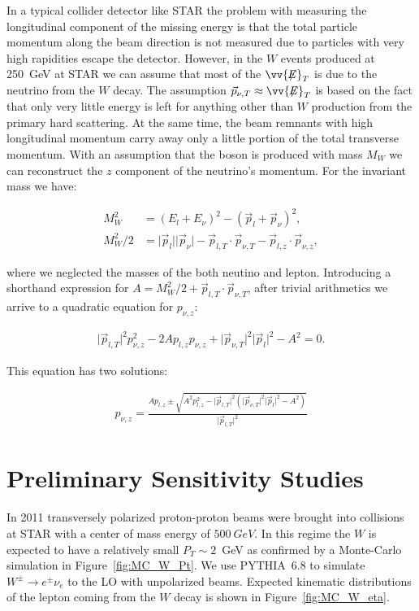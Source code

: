 \documentclass[12pt]{article}
\newcommand{\missET}{\vv{\not{\!\!E}}_T}
\newcommand{\abs}[1]{\lvert#1\rvert}
\begin{document}
In a typical collider detector like STAR the problem with measuring the
longitudinal component of the missing energy is that the total particle momentum
along the beam direction is not measured due to particles with very high
rapidities escape the detector. However, in the $W$ events produced at 250~GeV
at STAR we can assume that most of the $\missET$ is due to the neutrino from the
$W$ decay. The assumption $\vec{p}_{\nu, T} \approx \missET$ is based on the
fact that only very little energy is left for anything other than $W$ production
from the primary hard scattering. At the same time, the beam remnants with high
longitudinal momentum carry away only a little portion of the total transverse
momentum. With an assumption that the boson is produced with mass $M_W$ we can
reconstruct the $z$ component of the neutrino's momentum. For the invariant mass
we have:

\begin{align}
M^2_W &= (E_l + E_\nu)^2 - (\vec{p}_l + \vec{p}_\nu)^2,\\
M^2_W/2 &= \abs{\vec{p}_l} \abs{\vec{p}_\nu} - \vec{p}_{l,T} \cdot \vec{p}_{\nu,T} - \vec{p}_{l,z} \cdot \vec{p}_{\nu,z},
\end{align}

\noindent
where we neglected the masses of the both neutino and lepton. Introducing a
shorthand expression for $A = M^2_W/2 + \vec{p}_{l,T} \cdot \vec{p}_{\nu,T}$,
after trivial arithmetics we arrive to a quadratic equation for $p_{\nu,z}$:

\begin{align}
\abs{\vec{p}_{l,T}}^2 p^2_{\nu,z} - 2A p_{l,z} p_{\nu,z} + \abs{\vec{p}_{\nu,T}}^2 \abs{\vec{p}_{l}}^2 - A^2 = 0.
\end{align}

This equation has two solutions:

\begin{align}
p_{\nu,z} = \frac{ A p_{l,z} \pm \sqrt{ A^2 p^2_{l,z} - \abs{\vec{p}_{l,T}}^2 (\abs{\vec{p}_{\nu,T}}^2 \abs{\vec{p}_{l}}^2 - A^2) } }{\abs{\vec{p}_{l,T}}^2}
\end{align}



\section{Preliminary Sensitivity Studies}

In 2011 transversely polarized proton-proton beams were brought into collisions
at STAR with a center of mass energy of $500~GeV$. In this regime the $W$ is
expected to have a relatively small $P_T \sim 2$~GeV as confirmed by a
Monte-Carlo simulation in Figure~\ref{fig:MC_W_Pt}. We use PYTHIA~6.8 to
simulate $W^\pm \to e^\pm \nu_e$ to the LO with unpolarized beams. Expected
kinematic distributions of the lepton coming from the $W$ decay is shown in
Figure~\ref{fig:MC_W_eta}.
\end{document}
